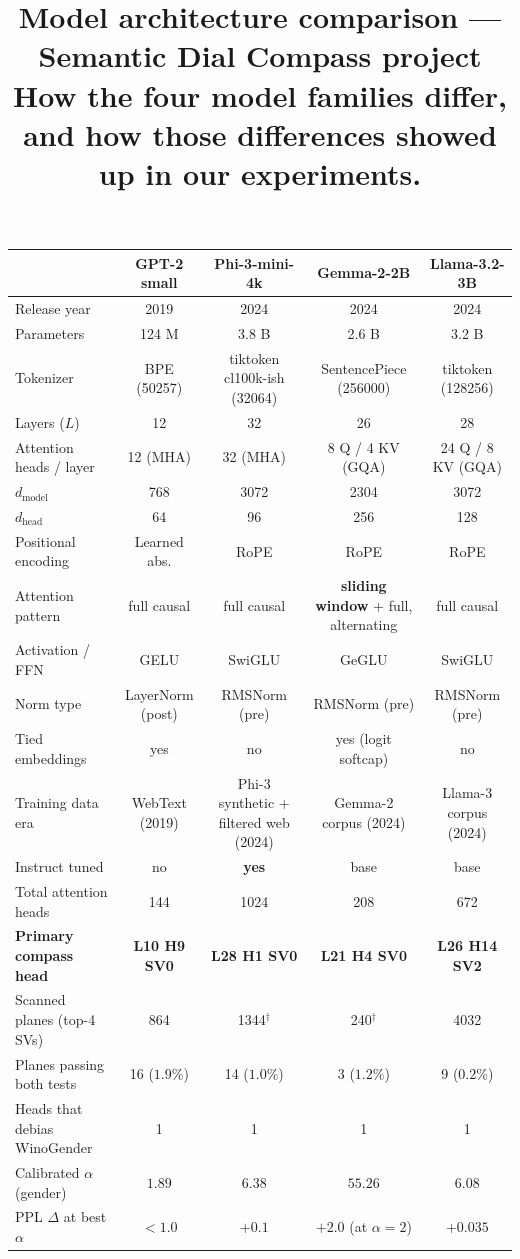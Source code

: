 \documentclass[11pt]{article}
\title{\vspace{-20pt}\textbf{Model architecture comparison --- Semantic Dial Compass project}\\[2pt]
\normalsize\normalfont How the four model families differ, and how those differences showed up in our experiments.}
\author{}
\date{}
\begin{document}
\maketitle
\vspace{-36pt}

\begin{center}
\small
\begin{tabular}{@{}l|cccc@{}}
\toprule
 & \textbf{\textcolor{gpt2c}{GPT-2 small}} & \textbf{\textcolor{phi3c}{Phi-3-mini-4k}} & \textbf{\textcolor{gemmac}{Gemma-2-2B}} & \textbf{\textcolor{llamac}{Llama-3.2-3B}} \\
\midrule
Release year & 2019 & 2024 & 2024 & 2024 \\
Parameters & 124 M & 3.8 B & 2.6 B & 3.2 B \\
Tokenizer & BPE (50257) & tiktoken cl100k-ish (32064) & SentencePiece (256000) & tiktoken (128256) \\
Layers ($L$) & 12 & 32 & 26 & 28 \\
Attention heads / layer & 12 (MHA) & 32 (MHA) & 8 Q / 4 KV (GQA) & 24 Q / 8 KV (GQA) \\
$d_\text{model}$ & 768 & 3072 & 2304 & 3072 \\
$d_\text{head}$ & 64 & 96 & 256 & 128 \\
Positional encoding & Learned abs. & RoPE & RoPE & RoPE \\
Attention pattern & full causal & full causal & \textbf{sliding window} + full, alternating & full causal \\
Activation / FFN & GELU & SwiGLU & GeGLU & SwiGLU \\
Norm type & LayerNorm (post) & RMSNorm (pre) & RMSNorm (pre) & RMSNorm (pre) \\
Tied embeddings & yes & no & yes (logit softcap) & no \\
Training data era & WebText (2019) & Phi-3 synthetic + filtered web (2024) & Gemma-2 corpus (2024) & Llama-3 corpus (2024) \\
Instruct tuned & no & \textbf{yes} & base & base \\
Total attention heads & 144 & 1024 & 208 & 672 \\
\midrule
\textbf{Primary compass head} & \textbf{L10 H9 SV0} & \textbf{L28 H1 SV0} & \textbf{L21 H4 SV0} & \textbf{L26 H14 SV2} \\
Scanned planes (top-4 SVs) & 864 & 1344$^{\dagger}$ & 240$^{\dagger}$ & 4032 \\
Planes passing both tests & 16 ($1.9\%$) & 14 ($1.0\%$) & 3 ($1.2\%$) & 9 ($0.2\%$) \\
Heads that debias WinoGender & 1 & 1 & 1 & 1 \\
Calibrated $\alpha$ (gender) & $1.89$ & $6.38$ & $55.26$ & $6.08$ \\
PPL $\Delta$ at best $\alpha$ & $<1.0$ & $+0.1$ & $+2.0$ (at $\alpha{=}2$) & $+0.035$ \\
\bottomrule
\end{tabular}
\end{center}
\end{document}
